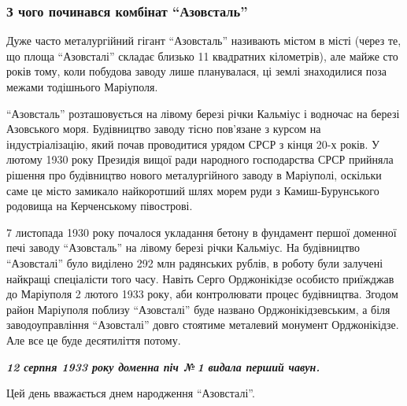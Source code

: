  
 
 
 
 

\subsubsection{З чого починався комбінат \enquote{Азовсталь}}

Дуже часто металургійний гігант \enquote{Азовсталь} називають містом в місті (через те,
що площа \enquote{Азовсталі} складає близько 11 квадратних кілометрів), але майже сто
років тому, коли побудова заводу лише планувалася, ці землі знаходилися поза
межами тодішнього Маріуполя.

\enquote{Азовсталь} розташовується на лівому березі річки Кальміус і водночас на березі
Азовського моря. Будівництво заводу тісно пов'язане з курсом на
індустріалізацію, який почав проводитися урядом СРСР з кінця 20-х років. У
лютому 1930 року Президія вищої ради народного господарства СРСР прийняла
рішення про будівництво нового металургійного заводу в Маріуполі, оскільки саме
це місто замикало найкоротший шлях морем руди з Камиш-Бурунського родовища на
Керченському півострові.

7 листопада 1930 року почалося укладання бетону в фундамент першої доменної
печі заводу \enquote{Азовсталь} на лівому березі річки Кальміус. На будівництво
\enquote{Азовсталі} було виділено 292 млн радянських рублів, в роботу були залучені
найкращі спеціалісти того часу. Навіть Серго Орджонікідзе особисто приїжджав до
Маріуполя 2 лютого 1933 року, аби контролювати процес будівництва. Згодом район
Маріуполя поблизу \enquote{Азовсталі} буде названо Орджонікідзевським, а біля
заводоуправління \enquote{Азовсталі} довго стоятиме металевий монумент Орджонікідзе.
Але все це буде десятиліття потому.


\begin{center}
  \em\color{blue}\bfseries\Large
12 серпня 1933 року доменна піч № 1 видала перший чавун.

Цей день вважається днем народження \enquote{Азовсталі}.
\end{center}


